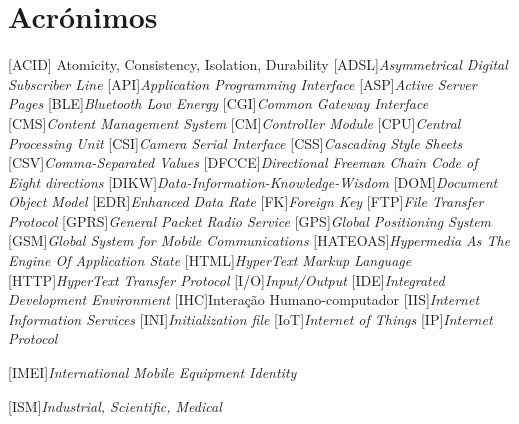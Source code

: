 
\chapter*{Acrónimos}

\begin{multicols}{2}
	
\begin{acronym}[RELAX NG]
	[ACID]{ Atomicity, Consistency, Isolation, Durability}
	[ADSL]{\textit{Asymmetrical Digital Subscriber Line}}
	[API]{\textit{Application Programming Interface}}
	[ASP]{\textit{Active Server Pages}}
	[BLE]{\textit{Bluetooth Low Energy}}
	[CGI]{\textit{Common Gateway Interface}}
	[CMS]{\textit{Content Management System}}
	[CM]{\textit{Controller Module}}
	[CPU]{\textit{Central Processing Unit}}
	[CSI]{\textit{Camera Serial Interface}}
	[CSS]{\textit{Cascading Style Sheets}}
	[CSV]{\textit{Comma-Separated Values}}
	[DFCCE]{\textit{Directional Freeman Chain Code of Eight directions}}
	[DIKW]{\textit{Data-Information-Knowledge-Wisdom}}
	[DOM]{\textit{Document Object Model}}
	[EDR]{\textit{Enhanced Data Rate}}
	[FK]{\textit{Foreign Key}}
	[FTP]{\textit{File Transfer Protocol}}
	[GPRS]{\textit{General Packet Radio Service}}
	[GPS]{\textit{Global Positioning System}}
	[GSM]{\textit{Global System for Mobile Communications}}
	[HATEOAS]{\textit{Hypermedia As The Engine Of Application State}}
	[HTML]{\textit{HyperText Markup Language}}
	[HTTP]{\textit{HyperText Transfer Protocol}}
	[I/O]{\textit{Input/Output}}
	[IDE]{\textit{Integrated Development Environment}}
	[IHC]{Interação Humano-computador}
	[IIS]{\textit{Internet Information Services}}
	[INI]{\textit{Initialization file}}
	[IoT]{\textit{Internet of Things}}
	[IP]{\textit{Internet Protocol}}

	

		
	[IMEI]{\textit{International Mobile Equipment Identity}}
		
		[ISM]{\textit{Industrial, Scientific, Medical}}
	

\end{acronym}
\end{multicols}
